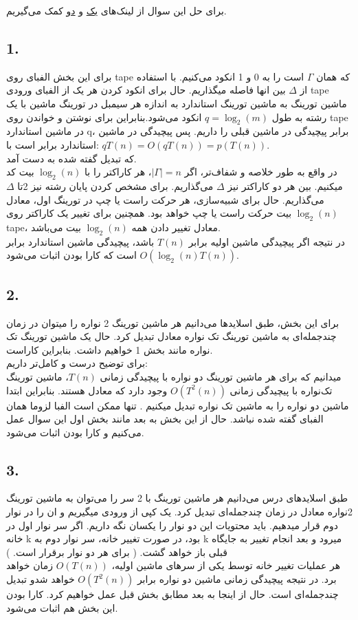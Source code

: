 برای حل این سوال از لینک‌های 
\href{https://datamove.imag.fr/denis.trystram/SupportsDeCours/TuringMachine2Basis.pdf}{یک} و 
\href{https://cs.uwaterloo.ca/~s4bendav/files/CS360S21Lec14.pdf}{دو}
کمک می‌گیریم.

\subsection*{1. }
برای این بخش الفبای روی 
tape 
که همان $\Gamma$ است را به 0 و 1 انکود می‌کنیم. با استفاده از 
$\Delta$ بین انها فاصله میگذاریم.
حال برای انکود کردن هر یک از الفبای ورودی tape
ماشین تورینگ به ماشین تورینگ استاندارد به اندازه هر سیمبل در تورینگ ماشین با یک رشته به طول
$q = \log_2(m)$ 
انکود می‌شود.بنابراین برای نوشتن و خواندن روی tape در ماشین استاندارد
q، برابر پیچیدگی در ماشین قبلی را داریم.
پس پیچیدگی در ماشین استاندارد برابر است با:
$qT(n) = O(qT(n)) = p(T(n))$.\\
که تبدیل گفته شده به دست آمد.\\
در واقع به طور خلاصه و شفاف‌تر، 
اگر 
$|\Gamma| = n$، هر کاراکتر را با
$\log_2(n)$ بیت کد میکنیم.
بین هر دو کاراکتر نیز $\Delta$ می‌گذاریم.
برای مشخص کردن پایان رشته نیز 2تا $\Delta$ می‌گذاریم.
حال برای شبیه‌سازی، هر حرکت راست یا چپ در تورینگ اول، معادل 
$\log_2(n)$ بیت حرکت راست یا چپ خواهد بود.
همچنین برای تغییر یک کاراکتر روی tape،
معادل تغییر دادن همه $\log_2(n)$ بیت می‌باشد.\\
در نتیجه اگر پیچیدگی ماشین اولیه برابر $T(n)$ باشد، پیچیدگی ماشین استاندارد برابر
$O(\log_2(n)T(n))$ است که کارا بودن اثبات می‌شود.

\subsection*{2. }
برای این بخش، طبق اسلایدها می‌دانیم هر ماشین تورینگ 2 نواره را میتوان در زمان چندجمله‌ای به ماشین تورینگ تک نواره معادل تبدیل کرد. حال یک ماشین تورینگ تک نواره مانند بخش 1 خواهیم داشت. بنابراین کاراست.\\
برای توضیح درست‌ و کامل‌تر داریم:
\\
میدانیم که برای هر ماشین تورینگ دو نواره با پیچیدگی زمانی
$T(n)$، ماشین تورینگ تک‌نواره با پیچیدگی زمانی 
$O(T^2(n))$ وجود دارد که معادل هستند.
بنابراین ابتدا ماشین دو نواره را به ماشین تک نواره تبدیل میکنیم
.
تنها ممکن است الفبا لزوما همان الفبای گفته شده نباشد. حال از این بخش به بعد مانند بخش اول این سوال عمل می‌کنیم و کارا بودن اثبات می‌شود.

\subsection*{3. }
طبق اسلایدهای درس می‌دانیم هر ماشین تورینگ با 2 سر را می‌توان به 
ماشین تورینگ 2نواره معادل در زمان چندجمله‌ای تبدیل کرد.
یک کپی از ورودی میگیریم و ان را در نوار دوم قرار میدهیم.
باید محتویات این دو نوار را یکسان نگه داریم.
اگر سر نوار اول در خانه k بود، در صورت تغییر خانه،
سر نوار دوم به k میرود و بعد انجام تغییر به جایگاه قبلی باز خواهد گشت.
( برای هر دو نوار برقرار است. )
\\
هر عملیات تغییر خانه توسط یکی از سرهای ماشین اولیه،
$O(T(n))$ زمان خواهد برد. در نتیجه پیچیدگی زمانی ماشین دو نواره برابر 
$O(T^2(n))$ خواهد شدو تبدیل چندجمله‌ای است.
حال از اینجا به بعد مطابق بخش قبل عمل خواهیم کرد.
کارا بودن این بخش هم اثبات می‌شود.
\\